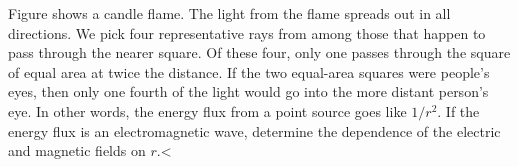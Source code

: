 Figure  shows a candle flame.  The light from
the flame spreads out in all directions. We pick four representative
rays from among those that happen to pass through the nearer square.
Of these four, only one passes through the square of equal area at
twice the distance. If the two equal-area squares were people's eyes,
then only one fourth of the light would go into the more distant
person's eye. In other words, the energy flux from a point source goes
like $1/r^2$. If the energy flux is an electromagnetic wave, determine
the dependence of the electric and magnetic fields on $r$.<%

